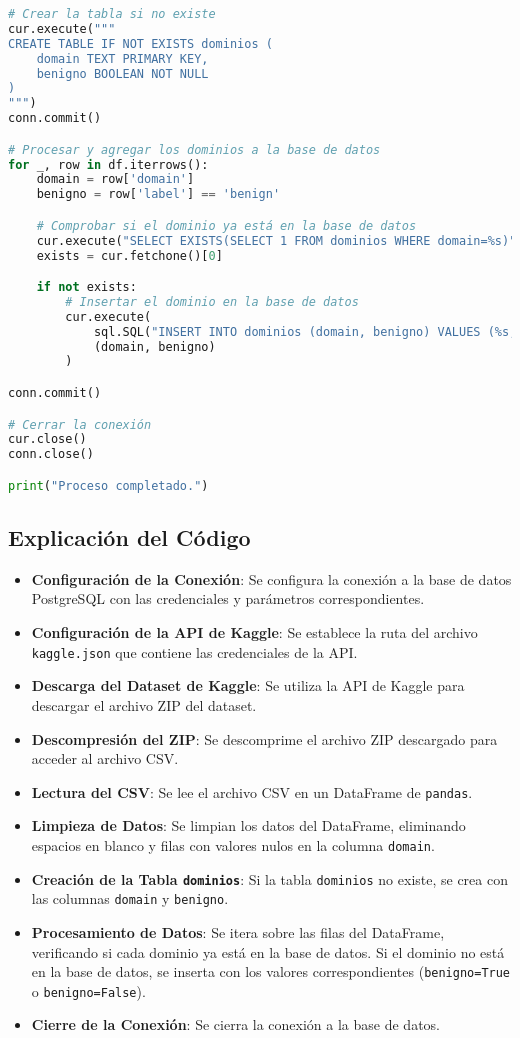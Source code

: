\begin{lstlisting}[language=Python, caption=Script para procesar dominios de Kaggle]
# Crear la tabla si no existe
cur.execute("""
CREATE TABLE IF NOT EXISTS dominios (
    domain TEXT PRIMARY KEY,
    benigno BOOLEAN NOT NULL
)
""")
conn.commit()

# Procesar y agregar los dominios a la base de datos
for _, row in df.iterrows():
    domain = row['domain']
    benigno = row['label'] == 'benign'

    # Comprobar si el dominio ya está en la base de datos
    cur.execute("SELECT EXISTS(SELECT 1 FROM dominios WHERE domain=%s)", (domain,))
    exists = cur.fetchone()[0]

    if not exists:
        # Insertar el dominio en la base de datos
        cur.execute(
            sql.SQL("INSERT INTO dominios (domain, benigno) VALUES (%s, %s)"),
            (domain, benigno)
        )

conn.commit()

# Cerrar la conexión
cur.close()
conn.close()

print("Proceso completado.")
\end{lstlisting}

\subsection*{Explicación del Código}

\begin{itemize}
    \item \textbf{Configuración de la Conexión}: Se configura la conexión a la base de datos PostgreSQL con las credenciales y parámetros correspondientes.
    \item \textbf{Configuración de la API de Kaggle}: Se establece la ruta del archivo \texttt{kaggle.json} que contiene las credenciales de la API.
    \item \textbf{Descarga del Dataset de Kaggle}: Se utiliza la API de Kaggle para descargar el archivo ZIP del dataset.
    \item \textbf{Descompresión del ZIP}: Se descomprime el archivo ZIP descargado para acceder al archivo CSV.
    \item \textbf{Lectura del CSV}: Se lee el archivo CSV en un DataFrame de \texttt{pandas}.
    \item \textbf{Limpieza de Datos}: Se limpian los datos del DataFrame, eliminando espacios en blanco y filas con valores nulos en la columna \texttt{domain}.
    \item \textbf{Creación de la Tabla \texttt{dominios}}: Si la tabla \texttt{dominios} no existe, se crea con las columnas \texttt{domain} y \texttt{benigno}.
    \item \textbf{Procesamiento de Datos}: Se itera sobre las filas del DataFrame, verificando si cada dominio ya está en la base de datos. Si el dominio no está en la base de datos, se inserta con los valores correspondientes (\texttt{benigno=True} o \texttt{benigno=False}).
    \item \textbf{Cierre de la Conexión}: Se cierra la conexión a la base de datos.
\end{itemize}